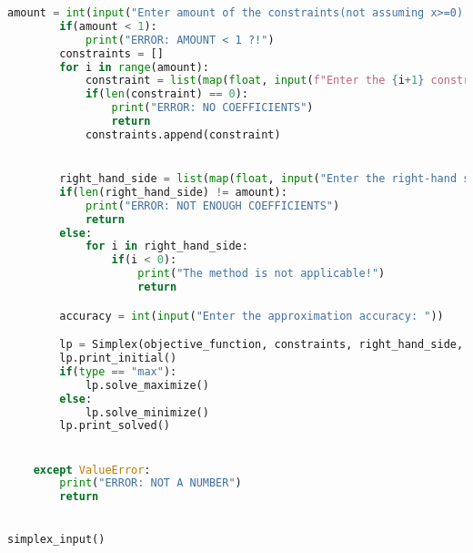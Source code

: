 \documentclass[12pt, legalpaper]{exam}
\begin{document}
\begin{lstlisting}[language=Python, caption=Программа на Python, label=lst:python-code]
        amount = int(input("Enter amount of the constraints(not assuming x>=0): "))
        if(amount < 1):
            print("ERROR: AMOUNT < 1 ?!")
        constraints = []
        for i in range(amount):
            constraint = list(map(float, input(f"Enter the {i+1} constraint function coefficients: ").split(" ")))
            if(len(constraint) == 0):
                print("ERROR: NO COEFFICIENTS")
                return
            constraints.append(constraint)


        right_hand_side = list(map(float, input("Enter the right-hand side numbers: ").split(" ")))
        if(len(right_hand_side) != amount):
            print("ERROR: NOT ENOUGH COEFFICIENTS")
            return
        else:
            for i in right_hand_side:
                if(i < 0):
                    print("The method is not applicable!")
                    return

        accuracy = int(input("Enter the approximation accuracy: "))

        lp = Simplex(objective_function, constraints, right_hand_side, accuracy)
        lp.print_initial()
        if(type == "max"):
            lp.solve_maximize()
        else:
            lp.solve_minimize()
        lp.print_solved()


    except ValueError:
        print("ERROR: NOT A NUMBER")
        return
    

simplex_input()

\end{lstlisting}
\end{document}
